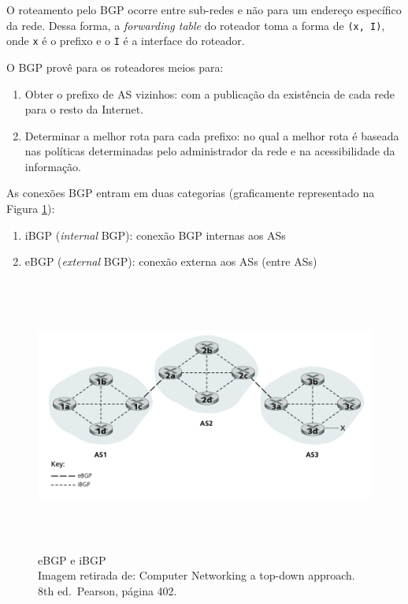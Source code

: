 O roteamento pelo BGP ocorre entre sub-redes e não para um endereço
específico da rede. Dessa forma, a \emph{forwarding table} do roteador
toma a forma de \texttt{(x,\ I)}, onde \texttt{x} é o prefixo e o
\texttt{I} é a interface do roteador.

O BGP provê para os roteadores meios para:

\begin{enumerate}
\def\labelenumi{\arabic{enumi}.}
\tightlist
\item
  Obter o prefixo de AS vizinhos: com a publicação da existência de cada
  rede para o resto da Internet.
\item
  Determinar a melhor rota para cada prefixo: no qual a melhor rota é
  baseada nas políticas determinadas pelo administrador da rede e na
  acessibilidade da informação.
\end{enumerate}

As conexões BGP entram em duas categorias (graficamente representado na
Figura \ref{fig:eBGP e iBGP}):

\begin{enumerate}
\def\labelenumi{\arabic{enumi}.}
\tightlist
\item
  iBGP (\emph{internal} BGP): conexão BGP internas aos ASs
\item
  eBGP (\emph{external} BGP): conexão externa aos ASs (entre ASs)
\end{enumerate}


\begin{figure}[h!]
\centering
\includegraphics[keepaspectratio, width=12cm, height=9cm]{imagens/14/14 - eBGP e iBGP.png}
\caption{eBGP e iBGP \\
Imagem retirada de: Computer Networking a top-down approach. 8th
ed.~Pearson, página 402. \\}
\label{fig:eBGP e iBGP}
\end{figure}



